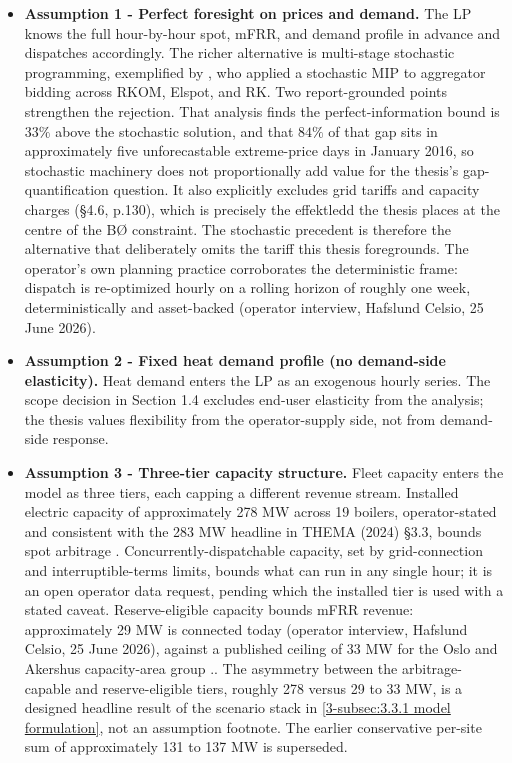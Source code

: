 \begin{itemize}
    \item \textbf{Assumption 1 - Perfect foresight on prices and demand.} The LP knows the full hour-by-hour spot, mFRR, and demand profile in advance and dispatches accordingly. The richer alternative is multi-stage stochastic programming, exemplified by \cite{ottesen_multi_2018}, who applied a stochastic MIP to aggregator bidding across RKOM, Elspot, and RK. Two report-grounded points strengthen the rejection. That analysis finds the perfect-information bound is $33\%$ above the stochastic solution, and that $84\%$ of that gap sits in approximately five unforecastable extreme-price days in January 2016, so stochastic machinery does not proportionally add value for the thesis's gap-quantification question. It also explicitly excludes grid tariffs and capacity charges (§4.6, p.130), which is precisely the effektledd the thesis places at the centre of the BØ constraint. The stochastic precedent is therefore the alternative that deliberately omits the tariff this thesis foregrounds. The operator's own planning practice corroborates the deterministic frame: dispatch is re-optimized hourly on a rolling horizon of roughly one week, deterministically and asset-backed (operator interview, Hafslund Celsio, 25 June 2026).

    \item \textbf{Assumption 2 - Fixed heat demand profile (no demand-side elasticity).} Heat demand enters the LP as an exogenous hourly series. The scope decision in Section 1.4 excludes end-user elasticity from the analysis; the thesis values flexibility from the operator-supply side, not from demand-side response.

    \item \textbf{Assumption 3 - Three-tier capacity structure.} Fleet capacity enters the model as three tiers, each capping a different revenue stream. Installed electric capacity of approximately 278 MW across 19 boilers, operator-stated and consistent with the 283 MW headline in THEMA (2024) §3.3, bounds spot arbitrage . Concurrently-dispatchable capacity, set by grid-connection and interruptible-terms limits, bounds what can run in any single hour; it is an open operator data request, pending which the installed tier is used with a stated caveat. Reserve-eligible capacity bounds mFRR revenue: approximately 29 MW is connected today (operator interview, Hafslund Celsio, 25 June 2026), against a published ceiling of 33 MW for the Oslo and Akershus capacity-area group \cite{statnett_innforing_2026}.. The asymmetry between the arbitrage-capable and reserve-eligible tiers, roughly 278 versus 29 to 33 MW, is a designed headline result of the scenario stack in \autoref{3-subsec:3.3.1 model formulation}, not an assumption footnote. The earlier conservative per-site sum of approximately 131 to 137 MW is superseded.


\end{itemize}
